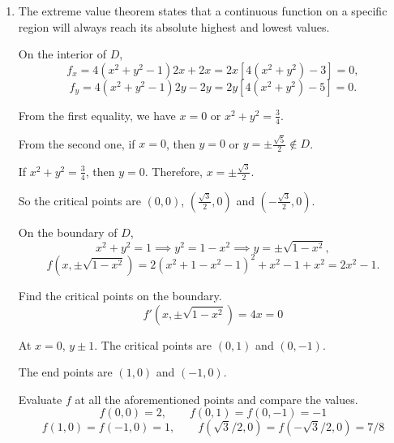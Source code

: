 \documentclass[a4paper, 12pt]{article}
\begin{document}
\begin{enumerate}[leftmargin=*,label=\textbf{\arabic*.}]
Thus the critical points are $(0,0),~(1,-1)$ and $(-1,-1)$. Obtain the Hessian determinant.
\[f_{xx}=4+4y,\quad f_{yy}=2,\quad f_{xy}=f_{yx}=4x\]
\[D=\begin{vmatrix}f_{xx} & f_{xy} \\f_{yx} & f_{yy}\end{vmatrix}=f_{xx}f_{yy}-f_{xy}^2=8+8y-16x^2\]

Evaluate $D$ at the points.
\[D(0,0)=8>0,\quad f_{yy}(0,0)=2>0\implies (0,0)\text{ is a local minimum.}\]
\[D(1,-1)=-16<0\implies (0,0)\text{ is a saddle point.}\]
\[D(-1,-1)=-16<0\implies (0,0)\text{ is a saddle point.}\]
\[\boxed{(0,0)\text{ is a local minimum. }(1,-1)\text{ and }(-1,-1)\text{ are saddle points.}}\]
\item The extreme value theorem states that a continuous function on a specific region will always reach its absolute highest and lowest values.

On the interior of $D$,
\[f_x=4(x^2+y^2-1)2x+2x=2x\left[4\left(x^2+y^2\right)-3\right]=0,\]
\[f_y=4(x^2+y^2-1)2y-2y= 2y\left[4\left(x^2+y^2\right)-5\right]=0.\]

From the first equality, we have $x=0$ or $x^2+y^2=\frac34$.

From the second one, if $x=0$, then $y=0$ or $y=\pm\frac{\sqrt5}2\notin D$.

If $x^2+y^2=\frac34$, then $y=0$. Therefore, $x=\pm\frac{\sqrt3}2$.

So the critical points are $(0,0)$, $\left(\frac{\sqrt3}2,0\right)$ and $\left(-\frac{\sqrt3}2,0\right)$.

On the boundary of $D$,
\[x^2+y^2=1\implies y^2=1-x^2\implies y=\pm\sqrt{1-x^2},\]
\[f\left(x,\pm \sqrt{1-x^2}\right)=2(x^2+1-x^2-1)^2+x^2-1+x^2=2x^2-1.\]

Find the critical points on the boundary.
\[f'\left(x,\pm\sqrt{1-x^2}\right)=4x=0\]

At $x=0$, $y\pm1$. The critical points are $(0,1)$ and $(0,-1)$.

The end points are $(1,0)$ and $(-1,0)$.

Evaluate $f$ at all the aforementioned points and compare the values.
\[f(0,0)=2,\qquad f(0,1)=f(0,-1)=-1\]
\[f(1,0)=f(-1,0)=1,\qquad f\left(\sqrt3/2, 0\right)=f\left(-\sqrt3/2,0\right)=7/8\]

\end{enumerate}
\end{document}
